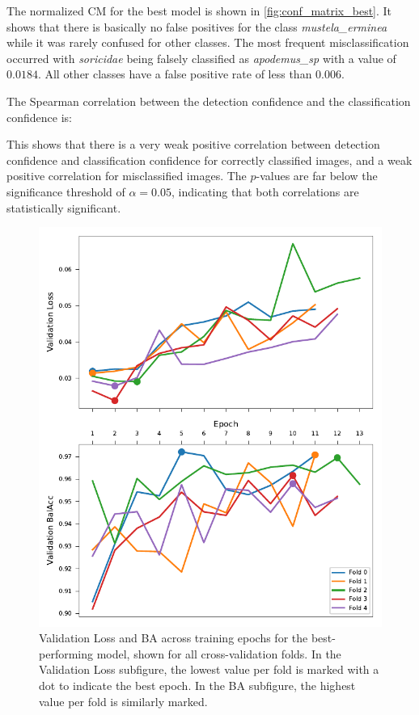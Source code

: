     The normalized \ac{CM} for the best model is shown in \autoref{fig:conf_matrix_best}.
    It shows that there is basically no false positives for the class \textit{mustela\_erminea} while it was rarely confused for other classes.
    The most frequent misclassification occurred with \textit{soricidae} being falsely classified as \textit{apodemus\_sp} with a value of \(0.0184\).
    All other classes have a false positive rate of less than \(0.006\).

    The Spearman correlation between the detection confidence and the classification confidence is:

    
    
    This shows that there is a very weak positive correlation between detection confidence and classification confidence for correctly classified images, and a weak positive correlation for misclassified images.
    The $p$-values are far below the significance threshold of \( \alpha = 0.05 \), indicating that both correlations are statistically significant.

    

    \begin{figure}[ht]
    \centering
    \includegraphics{figures/training_metrics_best_model.pdf}
    \caption{Validation Loss and \acs{BA} across training epochs for the best-performing model, shown for all cross-validation folds. In the Validation Loss subfigure, the lowest value per fold is marked with a dot to indicate the best epoch. In the \acs{BA} subfigure, the highest value per fold is similarly marked.}
    \label{fig:training_metrics_best_model}
    \end{figure}    

